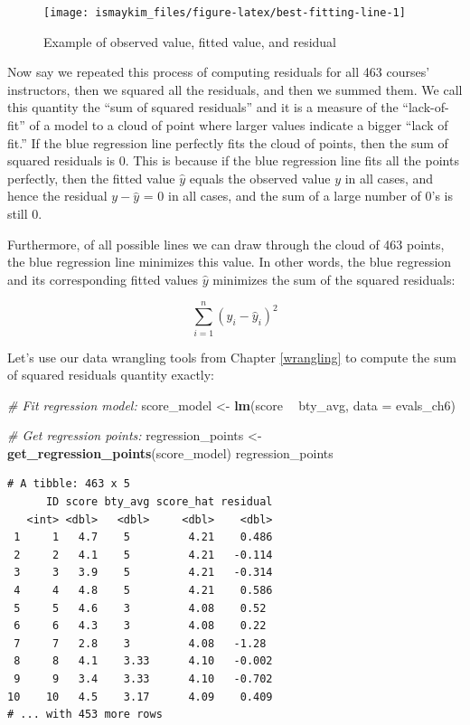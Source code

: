 \documentclass[12pt, krantz2,]{krantz}
\makeatletter
\newenvironment{Shaded}{\begin{snugshade}}{\end{snugshade}}
\newcommand{\CommentTok}[1]{\textcolor[rgb]{0.37,0.37,0.37}{\textit{#1}}}
\newcommand{\DataTypeTok}[1]{\textcolor[rgb]{0.27,0.27,0.27}{#1}}
\newcommand{\KeywordTok}[1]{\textcolor[rgb]{0.27,0.27,0.27}{\textbf{#1}}}
\newcommand{\NormalTok}[1]{#1}
\newcommand{\OperatorTok}[1]{\textcolor[rgb]{0.43,0.43,0.43}{\textbf{#1}}}
\newcommand{\StringTok}[1]{\textcolor[rgb]{0.5,0.5,0.5}{#1}}
\newenvironment{kframe}{%
\medskip{}
\setlength{\fboxsep}{.8em}
 \def\at@end@of@kframe{}%
 \ifinner\ifhmode%
  \def\at@end@of@kframe{\end{minipage}}%
  \begin{minipage}{\columnwidth}%
 \fi\fi%
 \def\FrameCommand##1{\hskip\@totalleftmargin \hskip-\fboxsep
 \colorbox{shadecolor}{##1}\hskip-\fboxsep
     \hskip-\linewidth \hskip-\@totalleftmargin \hskip\columnwidth}%
 \MakeFramed {\advance\hsize-\width
   \@totalleftmargin\z@ \linewidth\hsize
   \@setminipage}}%
 {\par\unskip\endMakeFramed%
 \at@end@of@kframe}
\renewenvironment{Shaded}{\begin{kframe}}{\end{kframe}}
\makeatother
\begin{document}
\begin{figure}

{\centering \texttt{[image: ismaykim\_files/figure-latex/best-fitting-line-1]} 

}

\caption{Example of observed value, fitted value, and residual}\label{fig:best-fitting-line}
\end{figure}

Now say we repeated this process of computing residuals for all 463 courses' instructors, then we squared all the residuals, and then we summed them. We call this quantity the ``sum of squared residuals'' and it is a measure of the ``lack-of-fit'' of a model to a cloud of point where larger values indicate a bigger ``lack of fit.'' If the blue regression line perfectly fits the cloud of points, then the sum of squared residuals is 0. This is because if the blue regression line fits all the points perfectly, then the fitted value \(\widehat{y}\) equals the observed value \(y\) in all cases, and hence the residual \(y-\widehat{y}\) = 0 in all cases, and the sum of a large number of 0's is still 0.

Furthermore, of all possible lines we can draw through the cloud of 463 points, the blue regression line minimizes this value. In other words, the blue regression and its corresponding fitted values \(\widehat{y}\) minimizes the sum of the squared residuals:

\[
\sum_{i=1}^{n}(y_i - \widehat{y}_i)^2
\]

Let's use our data wrangling tools from Chapter \ref{wrangling} to compute the sum of squared residuals quantity exactly:

\begin{Shaded}
\begin{Highlighting}[]
\CommentTok{# Fit regression model:}
\NormalTok{score_model <-}\StringTok{ }\KeywordTok{lm}\NormalTok{(score }\OperatorTok{~}\StringTok{ }\NormalTok{bty_avg, }\DataTypeTok{data =}\NormalTok{ evals_ch6)}

\CommentTok{# Get regression points:}
\NormalTok{regression_points <-}\StringTok{ }\KeywordTok{get_regression_points}\NormalTok{(score_model)}
\NormalTok{regression_points}
\end{Highlighting}
\end{Shaded}

\begin{verbatim}
# A tibble: 463 x 5
      ID score bty_avg score_hat residual
   <int> <dbl>   <dbl>     <dbl>    <dbl>
 1     1   4.7    5         4.21    0.486
 2     2   4.1    5         4.21   -0.114
 3     3   3.9    5         4.21   -0.314
 4     4   4.8    5         4.21    0.586
 5     5   4.6    3         4.08    0.52 
 6     6   4.3    3         4.08    0.22 
 7     7   2.8    3         4.08   -1.28 
 8     8   4.1    3.33      4.10   -0.002
 9     9   3.4    3.33      4.10   -0.702
10    10   4.5    3.17      4.09    0.409
# ... with 453 more rows
\end{verbatim}
\end{document}
